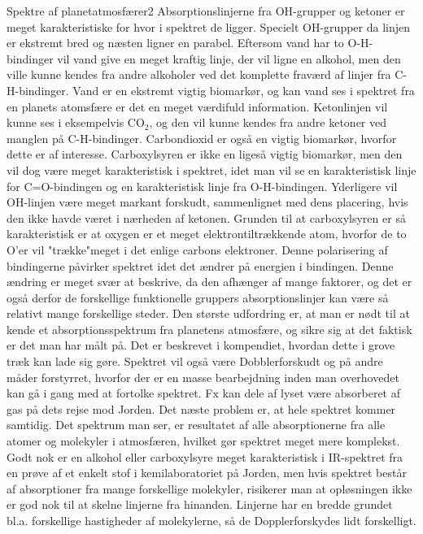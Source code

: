 %
%
\begin{opgave}{Spektre af planetatmosfærer}{2}
\opg Absorptionslinjerne fra OH-grupper og ketoner er meget karakteristiske for hvor i spektret de ligger. Specielt OH-grupper da linjen er ekstremt bred og næsten ligner en parabel. Eftersom vand har to O-H-bindinger vil vand give en meget kraftig linje, der vil ligne en alkohol, men den ville kunne kendes fra andre alkoholer ved det komplette fraværd af linjer fra C-H-bindinger. Vand er en ekstremt vigtig biomarkør, og kan vand ses i spektret fra en planets atomsfære er det en meget værdifuld information. Ketonlinjen vil kunne ses i eksempelvis CO$_2$, og den vil kunne kendes fra andre ketoner ved manglen på C-H-bindinger. Carbondioxid er også en vigtig biomarkør, hvorfor dette er af interesse. Carboxylsyren er ikke en ligeså vigtig biomarkør, men den vil dog være meget karakteristisk i spektret, idet man vil se en karakteristisk linje for C=O-bindingen og en karakteristisk linje fra O-H-bindingen. Yderligere vil OH-linjen være meget markant forskudt, sammenlignet med dens placering, hvis den ikke havde været i nærheden af ketonen. Grunden til at carboxylsyren er så karakteristisk er at oxygen er et meget elektrontiltrækkende atom, hvorfor de to O'er vil "trække"\:meget i det enlige carbons elektroner. Denne polarisering af bindingerne påvirker spektret idet det ændrer på energien i bindingen. Denne ændring er meget svær at beskrive, da den afhænger af mange faktorer, og det er også derfor de forskellige funktionelle gruppers absorptionslinjer kan være så relativt mange forskellige steder.
\opg Den største udfordring er, at man er nødt til at kende et absorptionsspektrum fra planetens atmosfære, og sikre sig at det faktisk er det man har målt på. Det er beskrevet i kompendiet, hvordan dette i grove træk kan lade sig gøre. Spektret vil også være Dobblerforskudt og på andre måder forstyrret, hvorfor der er en masse bearbejdning inden man overhovedet kan gå i gang med at fortolke spektret. Fx kan dele af lyset være absorberet af gas på dets rejse mod Jorden. Det næste problem er, at hele spektret kommer samtidig. Det spektrum man ser, er resultatet af alle absorptionerne fra alle atomer og molekyler i atmosfæren, hvilket gør spektret meget mere komplekst. Godt nok er en alkohol eller carboxylsyre meget karakteristisk i IR-spektret fra en prøve af et enkelt stof i kemilaboratoriet på Jorden, men hvis spektret består af absorptioner fra mange forskellige molekyler, risikerer man at opløsningen ikke er god nok til at skelne linjerne fra hinanden. Linjerne har en bredde grundet bl.a. forskellige hastigheder af molekylerne, så de Dopplerforskydes lidt forskelligt. 
\end{opgave}
